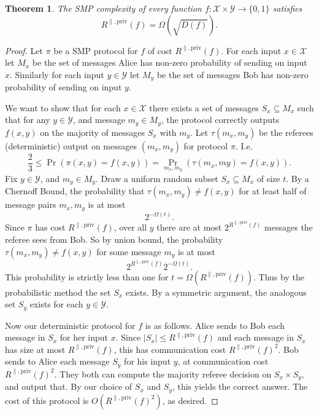 \documentclass[11pt]{amsart}
\theoremstyle{plain}
\newtheorem{theorem}{Theorem}
\theoremstyle{definition}
\theoremstyle{plain}
\newcommand{\calX}{\mathcal{X}}
\newcommand{\calY}{\mathcal{Y}}
\begin{document}
\begin{theorem}
The SMP complexity of every function $f : \calX \times \calY \to \{0,1\}$ satisfies
\[
R^{\parallel,\mathrm{priv}}(f) = \Omega(\sqrt{D(f)}).
\]
\end{theorem}

\begin{proof}
	Let $\pi$ be a SMP protocol for $f$ of cost $R^{\parallel,\mathrm{priv}}(f)$. For each input $x\in\calX$ let $M_x$ be the set of messages Alice has non-zero probability of sending on input $x$. Similarly for each input $y\in\calY$ let $M_y$ be the set of messages Bob has non-zero probability of sending on input $y$.
	
	We want to show that for each $x \in \calX$ there exists a set of messages $S_x \subseteq M_x$ such that for any $y \in \calY$, and message $m_y \in M_y$, the protocol correctly outputs $f(x,y)$ on the majority of messages $S_x$ with $m_y$. Let $\tau(m_x,m_y)$ be the referees (deterministic) output on messages $(m_x,m_y)$ for protocol $\pi$. I.e.
	$$\frac{2}{3} \leq \Pr(\pi(x,y) = f(x,y)) = \Pr_{m_x,m_y}(\tau(m_x,my) = f(x,y)).$$
	Fix $y\in \calY$, and $m_y \in M_y$. Draw a uniform random subset $S_x \subseteq M_x$  of size $t$. By a Chernoff Bound, the probability that $\tau(m_x,m_y) \neq f(x,y)$ for at least half of message pairs $m_x, m_y$ is at most
	$$2^{-\Omega(t)}.$$
	Since $\pi$ has cost $R^{\parallel,\mathrm{priv}}(f)$, over all $y$ there are at most $2^{R^{\parallel,\mathrm{priv}}(f)}$ messages the referee sees from Bob. So by union bound, the probability $\tau(m_x,m_y) \neq f(x,y)$ for some message $m_y$ is at most
	$$2^{R^{\parallel,\mathrm{priv}}(f)}2^{-\Omega(t)}.$$
	This probability is strictly less than one for $t = \Omega(R^{\parallel,\mathrm{priv}}(f))$. Thus by the probabilistic method the set $S_x$ exists. By a symmetric argument, the analogous set $S_y$ exists for each $y \in \calY$.
	
	Now our deterministic protocol for $f$ is as follows. Alice sends to Bob each message in $S_x$ for her input $x$. Since $|S_x| \leq R^{\parallel,\mathrm{priv}}(f)$ and each message in $S_x$ has size at most $R^{\parallel,\mathrm{priv}}(f)$, this has communication cost $R^{\parallel,\mathrm{priv}}(f)^2$. Bob sends to Alice each message $S_y$ for his input $y$, at communication cost $R^{\parallel,\mathrm{priv}}(f)^2$. They both can compute the majority referee decision on $S_x\times S_y$, and output that. By our choice of $S_x$ and $S_y$, this yields the correct answer. The cost of this protocol is $O(R^{\parallel,\mathrm{priv}}(f)^2)$, as desired.
\end{proof}
\end{document}
